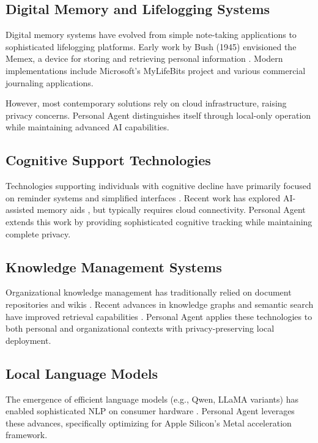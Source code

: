 \documentclass[11pt,letterpaper]{article}
\begin{document}
\subsection{Digital Memory and Lifelogging Systems}

Digital memory systems have evolved from simple note-taking applications to sophisticated lifelogging platforms. Early work by Bush (1945) envisioned the Memex, a device for storing and retrieving personal information \cite{placeholder}. Modern implementations include Microsoft's MyLifeBits project \cite{placeholder} and various commercial journaling applications.

However, most contemporary solutions rely on cloud infrastructure, raising privacy concerns. Personal Agent distinguishes itself through local-only operation while maintaining advanced AI capabilities.

\subsection{Cognitive Support Technologies}

Technologies supporting individuals with cognitive decline have primarily focused on reminder systems and simplified interfaces \cite{placeholder}. Recent work has explored AI-assisted memory aids \cite{placeholder}, but typically requires cloud connectivity. Personal Agent extends this work by providing sophisticated cognitive tracking while maintaining complete privacy.

\subsection{Knowledge Management Systems}

Organizational knowledge management has traditionally relied on document repositories and wikis \cite{placeholder}. Recent advances in knowledge graphs and semantic search have improved retrieval capabilities \cite{placeholder}. Personal Agent applies these technologies to both personal and organizational contexts with privacy-preserving local deployment.

\subsection{Local Language Models}

The emergence of efficient language models (e.g., Qwen, LLaMA variants) has enabled sophisticated NLP on consumer hardware \cite{placeholder}. Personal Agent leverages these advances, specifically optimizing for Apple Silicon's Metal acceleration framework.
\end{document}
